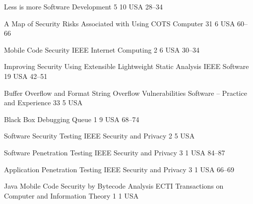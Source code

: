 \begin{thebibliography}{9}
		{}
		{Less is more}
		{Software Development}
		{5}
		{10}
		{USA}
		{}
		{28--34}
	
		{
			\BibAnd
			}
		{A Map of Security Risks Associated with Using {COTS}}
		{Computer}
		{31}
		{6}
		{USA}
		{}
		{60--66}
	
		{
			\BibAnd
			}
		{Mobile Code Security}
		{{IEEE} Internet Computing}
		{2}
		{6}
		{USA}
		{}
		{30--34}
	
		{
			\BibAnd
			}
		{Improving Security Using Extensible Lightweight Static Analysis}
		{{IEEE} Software}
		{19}
		{}
		{USA}
		{}
		{42--51}
	
		{
			\BibAnd
			}
		{Buffer Overflow and Format String Overflow Vulnerabilities}
		{Software -- Practice and Experience}
		{33}
		{5}
		{USA}
		{}
		{}
	
		{
			\BibAnd
			}
		{Black Box Debugging}
		{Queue}
		{1}
		{9}
		{USA}
		{}
		{68--74}
	
		{
			\BibAnd
			}
		{Software Security Testing}
		{{IEEE} Security and Privacy}
		{2}
		{5}
		{USA}
		{}
		{}
	
		{
			\BibAnd
			\BibAnd
			}
		{Software Penetration Testing}
		{{IEEE} Security and Privacy}
		{3}
		{1}
		{USA}
		{}
		{84--87}
	
		{}
		{Application Penetration Testing}
		{{IEEE} Security and Privacy}
		{3}
		{1}
		{USA}
		{}
		{66--69}
	
		{
			\BibAnd
			\BibAnd
			\BibAnd
			}
		{Java Mobile Code Security by Bytecode Analysis}
		{{ECTI} Transactions on Computer and Information Theory}
		{1}
		{1}
		{USA}
		{}
		{}
	

\end{thebibliography}
